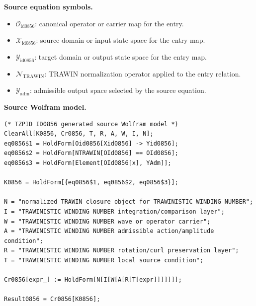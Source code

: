 \begin{minipage}[t]{0.49\linewidth}
\begingroup
\small
\raggedright
\textbf{Source equation symbols.}\par
\begin{itemize}[leftmargin=1.35em,itemsep=1pt,topsep=1pt,parsep=0pt]
    \item $\mathcal{O}_{\mathrm{id0856}}$: canonical operator or carrier map for the entry.
    \item $\mathcal{X}_{\mathrm{id0856}}$: source domain or input state space for the entry map.
    \item $\mathcal{Y}_{\mathrm{id0856}}$: target domain or output state space for the entry map.
    \item $\mathcal{N}_{\mathrm{TRAWIN}}$: TRAWIN normalization operator applied to the entry relation.
    \item $\mathcal{Y}_{\mathrm{adm}}$: admissible output space selected by the source equation.
\end{itemize}
\endgroup
\end{minipage}\hfill
\begin{minipage}[t]{0.47\linewidth}
\begingroup
\scriptsize
\raggedright
\textbf{Source Wolfram model.}\par
\begin{Verbatim}[fontsize=\tiny,breaklines=true,breakanywhere=true]
(* TZPID ID0856 generated source Wolfram model *)
ClearAll[K0856, Cr0856, T, R, A, W, I, N];
eq0856$1 = HoldForm[Oid0856[Xid0856] -> Yid0856];
eq0856$2 = HoldForm[NTRAWIN[OId0856] == OId0856];
eq0856$3 = HoldForm[Element[OId0856[x], YAdm]];

K0856 = HoldForm[{eq0856$1, eq0856$2, eq0856$3}];

N = "normalized TRAWIN closure object for TRAWINISTIC WINDING NUMBER";
I = "TRAWINISTIC WINDING NUMBER integration/comparison layer";
W = "TRAWINISTIC WINDING NUMBER wave or operator carrier";
A = "TRAWINISTIC WINDING NUMBER admissible action/amplitude condition";
R = "TRAWINISTIC WINDING NUMBER rotation/curl preservation layer";
T = "TRAWINISTIC WINDING NUMBER local source condition";

Cr0856[expr_] := HoldForm[N[I[W[A[R[T[expr]]]]]]];

Result0856 = Cr0856[K0856];
\end{Verbatim}
\endgroup
\end{minipage}

